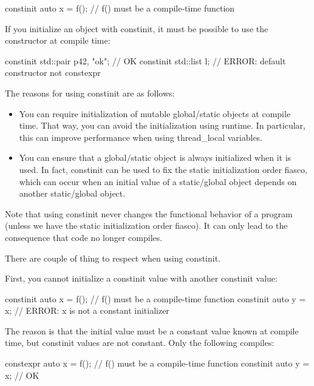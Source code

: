 \begin{cpp}
constinit auto x = f(); // f() must be a compile-time function
\end{cpp}

If you initialize an object with constinit, it must be possible to use the constructor at compile time:

\begin{cpp}
constinit std::pair p{42, "ok"}; // OK constinit std::list l; // ERROR: default constructor not constexpr
\end{cpp}

The reasons for using constinit are as follows:

\begin{itemize}
\item 
You can require initialization of mutable global/static objects at compile time. That way, you can avoid the initialization using runtime. In particular, this can improve performance when using thread\_local variables.

\item 
You can ensure that a global/static object is always initialized when it is used. In fact, constinit can be used to fix the static initialization order fiasco, which can occur when an initial value of a static/global object depends on another static/global object.
\end{itemize}

Note that using constinit never changes the functional behavior of a program (unless we have the static initialization order fiasco). It can only lead to the consequence that code no longer compiles.


There are couple of thing to respect when using constinit.

First, you cannot initialize a constinit value with another constinit value:

\begin{cpp}
constinit auto x = f(); // f() must be a compile-time function
constinit auto y = x; // ERROR: x is not a constant initializer
\end{cpp}

The reason is that the initial value must be a constant value known at compile time, but constinit values are not constant. Only the following compiles:

\begin{cpp}
constexpr auto x = f(); // f() must be a compile-time function
constinit auto y = x; // OK
\end{cpp}

